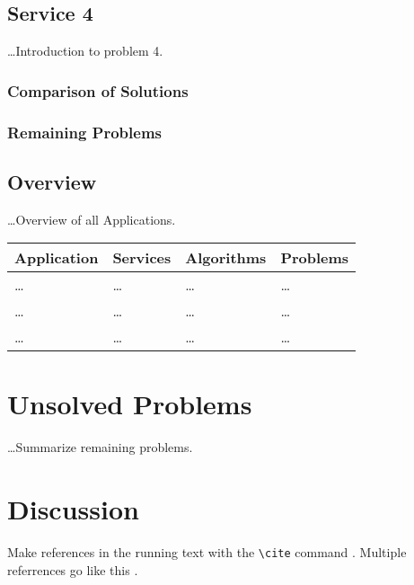 \documentclass[a4paper]{article}
\begin{document}
    \subsection{Service 4}
      \ldots Introduction to problem 4.

      \subsubsection{Comparison of Solutions}
      \subsubsection{Remaining Problems}

    \subsection{Overview}
      \ldots Overview of all Applications.
      
      \begin{tabular}{|p{3cm}|p{3cm}|p{3cm}|p{3cm}|}
        \hline
        Application & Services & Algorithms & Problems \\\hline
        \ldots & \ldots & \ldots & \ldots \\\hline
        \ldots & \ldots & \ldots & \ldots \\\hline
        \ldots & \ldots & \ldots & \ldots \\
        \hline
      \end{tabular}

\section{Unsolved Problems}

  \ldots Summarize remaining problems.

\section{Discussion}

  Make references in the running text with the \verb+\cite+
  command \cite{dijkstra68}. Multiple referrences go like this
  \cite{charniak85,steels98}.


  




\end{document}
